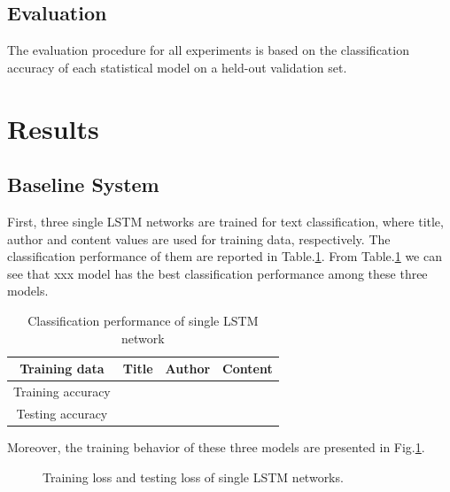 \documentclass[12pt]{article}
\begin{document}
\subsection{Evaluation}
The evaluation procedure for all experiments is based on the classification accuracy of each statistical model on a held-out validation set.

\section{Results}\label{results}

\subsection{Baseline System}

First, three single LSTM networks are trained for text classification, where title, author and content values are used for training data, respectively. The classification performance of them are reported in Table.\ref{single_lstm_acc}. From Table.\ref{single_lstm_acc} we can see that xxx model has the best classification performance among these three models.

\begin{table}[!t]
\begin{center}
\caption{Classification performance of single LSTM network}
\label{single_lstm_acc}
\begin{tabular}{c|c|c|c}
\hline
Training data & Title & Author & Content\\
\hline

Training accuracy &  &  &  \\

Testing accuracy & & & \\

\hline
\end{tabular}
\end{center}
\end{table}

Moreover, the training behavior of these three models are presented in Fig.\ref{training_loss_single}.


\begin{figure}[!t]
\begin{center}
\end{center}
\caption{Training loss and testing loss of single LSTM networks.}
\label{training_loss_single}
\end{figure}
\end{document}
